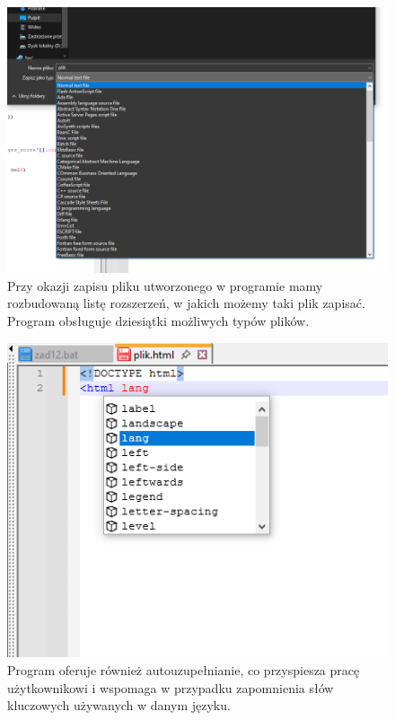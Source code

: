 \documentclass[0.82pt,a4paper]{article}
\begin{document}
    \begin{figure}[H]
        \centering
        \includegraphics[width=0.8\linewidth]{media/Notepad/notepad2.png}
        \caption[notepad zapis]{Przy okazji zapisu pliku utworzonego w programie mamy rozbudowaną listę rozszerzeń, w jakich możemy taki plik zapisać. Program obsługuje dziesiątki możliwych typów plików.}
        \label{fig:}
    \end{figure}

    \begin{figure}[H]
        \centering
        \includegraphics[width=0.8\linewidth]{media/Notepad/notepad3.png}
        \caption[notepad podpowiedzi]{Program oferuje również autouzupełnianie, co przyspiesza pracę użytkownikowi i wspomaga w przypadku zapomnienia słów kluczowych używanych w danym języku.}
        \label{fig:notepad_podpowiedzi}
    \end{figure}
\end{document}
